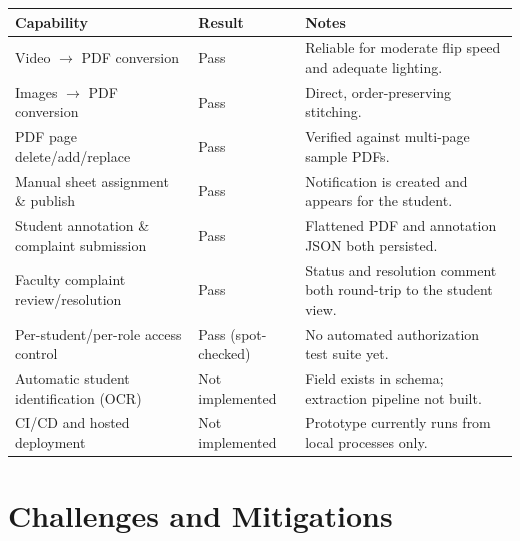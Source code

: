 \documentclass[11pt,a4paper]{article}
\begin{document}
\begin{longtable}{>{\RaggedRight}p{} >{\RaggedRight}p{} >{\RaggedRight}p{}}
\toprule
\textbf{Capability} & \textbf{Result} & \textbf{Notes} \\
\midrule\endhead
Video $\to$ PDF conversion & Pass &
  Reliable for moderate flip speed and adequate lighting. \\[0.4em]
Images $\to$ PDF conversion & Pass &
  Direct, order-preserving stitching. \\[0.4em]
PDF page delete/add/replace & Pass &
  Verified against multi-page sample PDFs. \\[0.4em]
Manual sheet assignment \& publish & Pass &
  Notification is created and appears for the student. \\[0.4em]
Student annotation \& complaint submission & Pass &
  Flattened PDF and annotation JSON both persisted. \\[0.4em]
Faculty complaint review/resolution & Pass &
  Status and resolution comment both round-trip to the student view. \\[0.4em]
Per-student/per-role access control & Pass (spot-checked) &
  No automated authorization test suite yet. \\[0.4em]
Automatic student identification (OCR) & Not implemented &
  Field exists in schema; extraction pipeline not built. \\[0.4em]
CI/CD and hosted deployment & Not implemented &
  Prototype currently runs from local processes only. \\
\bottomrule
\end{longtable}

\section{Challenges and Mitigations}
\label{sec:challenges}
\end{document}
